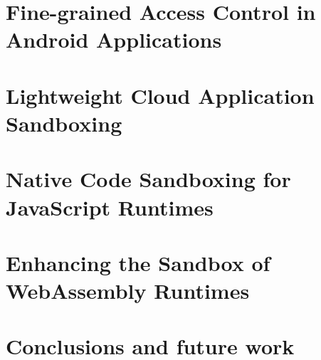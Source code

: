 \documentclass[12pt,a4paper,oldfontcommands,openright]{memoir}
\begin{document}
\chapter[Fine-grained Access Control in Android Applications]{Fine-grained Access Control in \\ Android Applications}
\label{chap:seapp}

\chapter[Lightweight Cloud Application Sandboxing]{Lightweight Cloud Application \\ Sandboxing}
\label{chap:dmng}

\chapter[Native Code Sandboxing for JavaScript Runtimes]{Native Code Sandboxing for \\ JavaScript Runtimes}
\label{chap:natisand}

\chapter[Enhancing the Sandbox of WebAssembly Runtimes]{Enhancing the Sandbox of \\ WebAssembly Runtimes}
\label{chap:wasm}

\chapter[Conclusions]{Conclusions and future work}
\label{chap:conclusions}




\renewcommand\bibname{References}


\nocite{*} %
\end{document}
